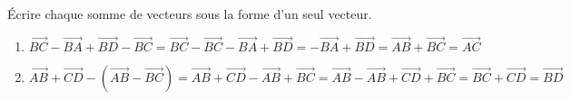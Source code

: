 
Écrire chaque somme de vecteurs sous la forme d'un seul vecteur.
\begin{enumerate}
\item $\overrightarrow{BC}-\overrightarrow{BA}+\overrightarrow{BD}-\overrightarrow{BC} =  \overrightarrow{BC}-\overrightarrow{BC}-\overrightarrow{BA}+\overrightarrow{BD} =  -\overrightarrow{BA}+\overrightarrow{BD} =  \overrightarrow{AB}+\overrightarrow{BC} = \overrightarrow{AC} $


\item $\overrightarrow{AB}+\overrightarrow{CD}- \left(\overrightarrow{AB}-\overrightarrow{BC} \right)= \overrightarrow{AB}+\overrightarrow{CD}- \overrightarrow{AB}+\overrightarrow{BC}=  \overrightarrow{AB}- \overrightarrow{AB}+\overrightarrow{CD} +\overrightarrow{BC} =  \overrightarrow{BC} + \overrightarrow{CD}= \overrightarrow{BD} $


\end{enumerate}